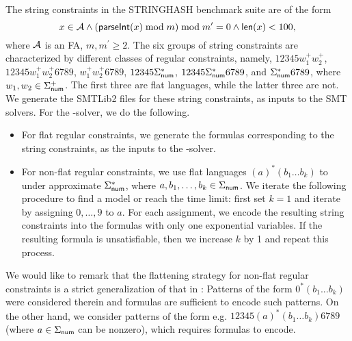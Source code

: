 The string constraints in the STRINGHASH benchmark suite are of the form 
$$x \in \mathcal{A} \wedge \left( \textsf{parseInt}(x) \bmod m \right) \bmod m^\prime = 0   \notag \wedge \textsf{len}(x) < 100,$$ 
where $\mathcal{A}$ is an FA, $m, m^\prime \ge 2.$ 
The six groups of string constraints are characterized by different classes of regular constraints, namely, $12345w^+_1 w^+_2$,  $12345 w^+_1  w^+_2 6789$, $w^+_1 w^+_2 6789$, $12345\Sigma_{\sf num}^*$, $12345\Sigma_{\sf num}^* 6789$, and $\Sigma_{\sf num}^* 6789$, where $w_1,w_2 \in \Sigma^+_{\sf num}$. The first three are flat languages, while the latter three are not. We generate the SMTLib2 files for these string constraints, as inputs to the SMT solvers. For the {\paexp}-solver, we do the following.   
\begin{itemize}
\item For flat regular constraints, we generate the {\paexp} formulas corresponding to the string constraints, as the inputs to the {\paexp}-solver.
%
\item For non-flat regular constraints, we use flat languages $(a)^* (b_{1} \ldots b_{k})$ to under approximate 
$\Sigma_{\sf num}^*$,  where $a, b_1,\ldots, b_k \in \Sigma_{\sf num}$. 
%
%
We iterate the following procedure to find a model or reach the time limit: first set $k=1$ and iterate by assigning $0, \ldots, 9$ to $a$. For each assignment, we encode the resulting string constraints into the {\paexp} formulas with only one exponential variables. If the resulting {\paexp} formula is unsatisfiable, then we increase $k$ by 1 and repeat this process. 
\end{itemize}
We would like to remark that the flattening strategy for non-flat regular constraints is a strict generalization of that in \cite{Parosh:20:PLDI}: Patterns of the form $0^*(b_1...b_k)$ were considered therein and {\pa} formulas are sufficient to encode such patterns. On the other hand, we consider patterns of the form e.g. $12345 (a)^* (b_1 \ldots b_k) 6789$ (where $a \in \Sigma_{\sf num}$ can be nonzero), which requires {\paexp} formulas to encode.


